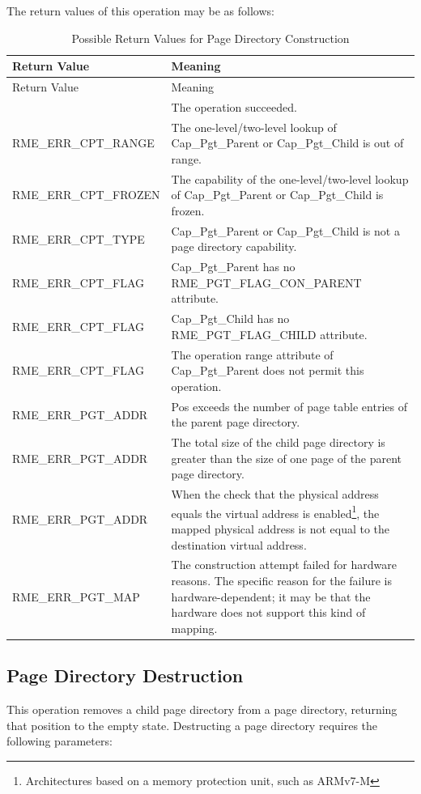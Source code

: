 The return values of this operation may be as follows:

\begin{xltabular}{\textwidth}{@{}>{\hsize\raggedright\arraybackslash}X>{\hsize\raggedright\arraybackslash}X@{}}
\caption{Possible Return Values for Page Directory Construction}\label{tab:3-19-construct-page-directory-return-values}\\
\toprule
Return Value & Meaning\tabularnewline
\endfirsthead
\toprule
Return Value & Meaning\tabularnewline
\midrule
\endhead
\bottomrule
{} & The operation succeeded.\tabularnewline
    RME\_ERR\_CPT\_RANGE & The one-level/two-level lookup of Cap\_Pgt\_Parent or Cap\_Pgt\_Child is out of range.\tabularnewline
    RME\_ERR\_CPT\_FROZEN & The capability of the one-level/two-level lookup of Cap\_Pgt\_Parent or Cap\_Pgt\_Child is frozen.\tabularnewline
    RME\_ERR\_CPT\_TYPE & Cap\_Pgt\_Parent or Cap\_Pgt\_Child is not a page directory capability.\tabularnewline
    RME\_ERR\_CPT\_FLAG & Cap\_Pgt\_Parent has no RME\_PGT\_FLAG\_CON\_PARENT attribute.\tabularnewline
    RME\_ERR\_CPT\_FLAG & Cap\_Pgt\_Child has no RME\_PGT\_FLAG\_CHILD attribute.\tabularnewline
    RME\_ERR\_CPT\_FLAG & The operation range attribute of Cap\_Pgt\_Parent does not permit this operation.\tabularnewline
    RME\_ERR\_PGT\_ADDR & Pos exceeds the number of page table entries of the parent page directory.\tabularnewline
    RME\_ERR\_PGT\_ADDR & The total size of the child page directory is greater than the size of one page of the parent page directory.\tabularnewline
    RME\_ERR\_PGT\_ADDR & When the check that the physical address equals the virtual address is enabled\footnote{Architectures based on a memory protection unit, such as ARMv7-M}, the mapped physical address is not equal to the destination virtual address.\tabularnewline
    RME\_ERR\_PGT\_MAP & The construction attempt failed for hardware reasons. The specific reason for the failure is hardware-dependent; it may be that the hardware does not support this kind of mapping.\tabularnewline
\end{xltabular}
\nopagebreak[4]

\subsection{Page Directory Destruction}\label{subsec:3-destruct-page-directory}

This operation removes a child page directory from a page directory, returning that position to the empty state. Destructing a page directory requires the following parameters:

